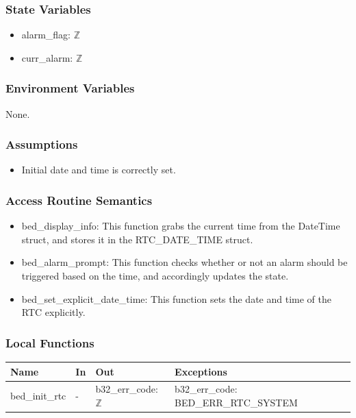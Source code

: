 \documentclass[12pt, titlepage]{article}
\begin{document}
\subsubsection{State Variables}
\begin{itemize}
\item alarm\_flag: $\mathbb{Z}$
\item curr\_alarm: $\mathbb{Z}$
\end{itemize}
\subsubsection{Environment Variables}

None.

\subsubsection{Assumptions}

\begin{itemize}
\item Initial date and time is correctly set.
\end{itemize}

\subsubsection{Access Routine Semantics}

\begin{itemize}
\item bed\_display\_info: This function grabs the current time from the DateTime struct, and stores it in the RTC\_DATE\_TIME struct.
\item bed\_alarm\_prompt: This function checks whether or not an alarm should be triggered based on the time, and accordingly updates the state.
\item bed\_set\_explicit\_date\_time: This function sets the date and time of the RTC explicitly.
\end{itemize}

\subsubsection{Local Functions}

\begin{center}
\begin{tabular}{p{3cm} p{3cm} p{2cm} p{4cm}}
\hline
\textbf{Name} & \textbf{In} & \textbf{Out} & \textbf{Exceptions} \\
\hline
bed\_init\_rtc & - & b32\_err\_code: $\mathbb{Z}$ & b32\_err\_code: BED\_ERR\_RTC\_SYSTEM \\
\hline
\end{tabular}
\end{center}
\end{document}
